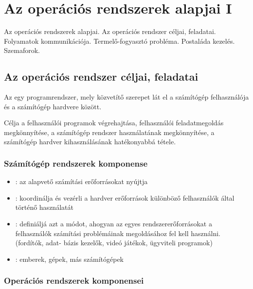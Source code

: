 \documentclass[../main.tex]{subfiles}
\begin{document}
\section{Az operációs rendszerek alapjai I}

\begin{fulltheorem}
  Az operációs rendszerek alapjai. Az operációs rendszer céljai, feladatai.
  Folyamatok kommunikációja. Termelő-fogyasztó probléma. Postaláda kezelés.
  Szemaforok.
\end{fulltheorem}

\subsection{Az operációs rendszer céljai, feladatai}

Az  egy programrendszer, mely közvetítő szerepet
lát el a számítógép felhasználója és a számítógép hardvere között.

Célja a felhasználói programok végrehajtása, felhasználói feladatmegoldás
megkönnyítése, a számítógép rendszer használatának megkönnyítése, a
számítógép hardver kihasználásának hatékonyabbá tétele.

\subsubsection*{Számítógép rendszerek komponense}

\begin{itemize}
  \item {}:
        az alapvető számítási erőforrásokat nyújtja
  \item {}:
        koordinálja és vezérli a hardver erőforrások különböző
        felhasználók által történő használatát
  \item {}:
        definiáljá azt a módot, ahogyan az egyes rendszererőforrásokat
        a felhasználók számítási problémáinak megoldásához fel kell használni.
        (fordítók, adat- bázis kezelők, videó játékok, ügyviteli programok)
  \item {}:
        emberek, gépek, más számítógépek
\end{itemize}

\subsubsection*{Operációs rendszerek komponensei}
\end{document}
